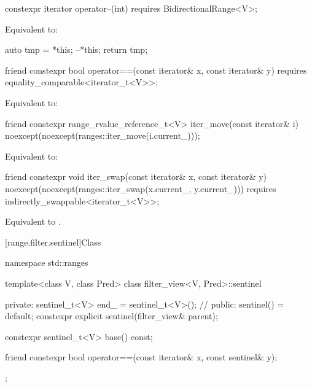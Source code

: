 %
\begin{itemdecl}
constexpr iterator operator--(int) requires BidirectionalRange<V>;
\end{itemdecl}

\begin{itemdescr}
\pnum
\effects Equivalent to:
\begin{codeblock}
auto tmp = *this;
--*this;
return tmp;
\end{codeblock}
\end{itemdescr}

%
\begin{itemdecl}
friend constexpr bool operator==(const iterator& x, const iterator& y)
  requires equality_comparable<iterator_t<V>>;
\end{itemdecl}

\begin{itemdescr}
\pnum
\effects Equivalent to: 
\end{itemdescr}

%
\begin{itemdecl}
friend constexpr range_rvalue_reference_t<V> iter_move(const iterator& i)
  noexcept(noexcept(ranges::iter_move(i.current_)));
\end{itemdecl}

\begin{itemdescr}
\pnum
\effects Equivalent to: 
\end{itemdescr}

%
\begin{itemdecl}
friend constexpr void iter_swap(const iterator& x, const iterator& y)
  noexcept(noexcept(ranges::iter_swap(x.current_, y.current_)))
  requires indirectly_swappable<iterator_t<V>>;
\end{itemdecl}

\begin{itemdescr}
\pnum
\effects Equivalent to .
\end{itemdescr}

[range.filter.sentinel]{Class }

%
\begin{codeblock}
namespace std::ranges {
  template<class V, class Pred>
  class filter_view<V, Pred>::sentinel {
  private:
    sentinel_t<V> end_ = sentinel_t<V>();       // \expos
  public:
    sentinel() = default;
    constexpr explicit sentinel(filter_view& parent);

    constexpr sentinel_t<V> base() const;

    friend constexpr bool operator==(const iterator& x, const sentinel& y);
  };
}
\end{codeblock}

